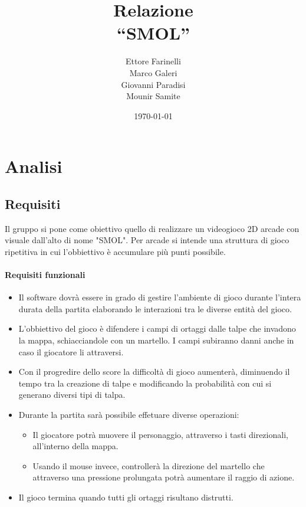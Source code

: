 \documentclass[a4paper,12pt]{report}
\title{Relazione \\``SMOL''}
\author{Ettore Farinelli \\ Marco Galeri \\ Giovanni Paradisi \\ Mounir Samite}
\date{\today}
\begin{document}
\maketitle

\tableofcontents


\chapter{Analisi}

\section{Requisiti}
Il gruppo si pone come obiettivo quello di realizzare un videogioco 2D arcade con visuale dall’alto di nome "SMOL".
Per arcade si intende una struttura di gioco ripetitiva in cui l'obbiettivo è accumulare più punti possibile.
%

\subsubsection{Requisiti funzionali}
\begin{itemize}
    \item Il software dovrà essere in grado di gestire l'ambiente di gioco durante l'intera durata della partita elaborando le interazioni tra le diverse entità del gioco.
    \item L’obbiettivo del gioco è difendere i campi di ortaggi dalle talpe che invadono la mappa, schiacciandole con un martello. I campi subiranno danni anche in caso 
        il giocatore li attraversi.
    \item Con il progredire dello score la difficoltà di gioco aumenterà, diminuendo il tempo tra la creazione di talpe e modificando la probabilità 
        con cui si generano diversi tipi di talpa.
    \item Durante la partita sarà possibile effetuare diverse operazioni:
    \begin{itemize}
        \item Il giocatore potrà muovere il personaggio, attraverso i tasti direzionali, all’interno della mappa.
        \item Usando il mouse invece, controllerà la direzione del martello che attraverso una pressione prolungata potrà aumentare il raggio di azione.
    \end{itemize}
    \item Il gioco termina quando tutti gli ortaggi risultano distrutti.
\end{itemize}
\end{document}

